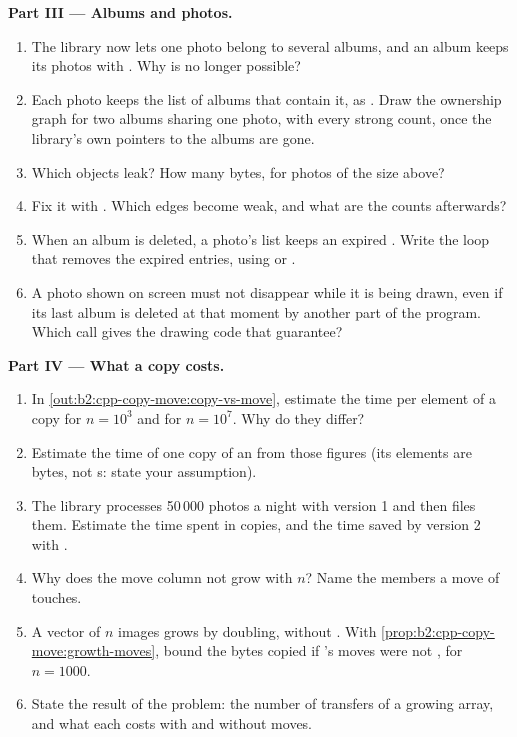 \begin{problem}
\medskip\noindent\textbf{Part III --- Albums and photos.}\par\nopagebreak
\begin{enumerate}[resume, beginpenalty=10000]
\item The library now lets one photo belong to several albums, and an album keeps its photos with
. Why is  no longer possible?
\item Each photo keeps the list of albums that contain it, as . Draw the
ownership graph for two albums sharing one photo, with every strong count, once the library's own pointers to the
albums are gone.
\item Which objects leak? How many bytes, for photos of the size above?
\item Fix it with . Which edges become weak, and what are the counts afterwards?
\item When an album is deleted, a photo's list keeps an expired . Write the loop that removes the
expired entries, using  or .
\item A photo shown on screen must not disappear while it is being drawn, even if its last album is deleted at that
moment by another part of the program. Which call gives the drawing code that guarantee?
\end{enumerate}

\medskip\noindent\textbf{Part IV --- What a copy costs.}\par\nopagebreak
\begin{enumerate}[resume, beginpenalty=10000]
\item In \cref{out:b2:cpp-copy-move:copy-vs-move}, estimate the time per element of a copy for $n = 10^3$ and for
$n = 10^7$. Why do they differ?
\item Estimate the time of one copy of an  from those figures (its elements are bytes, not
s: state your assumption).
\item The library processes 50\,000 photos a night with version 1 and then files them. Estimate the time spent in
copies, and the time saved by version 2 with .
\item Why does the move column not grow with $n$? Name the members a move of  touches.
\item A vector of $n$ images grows by doubling, without . With \cref{prop:b2:cpp-copy-move:growth-moves},
bound the bytes copied if 's moves were not , for $n = 1000$.
\item State the result of the problem: the number of transfers of a growing array, and what each costs with and
without  moves.
\end{enumerate}
\end{problem}
